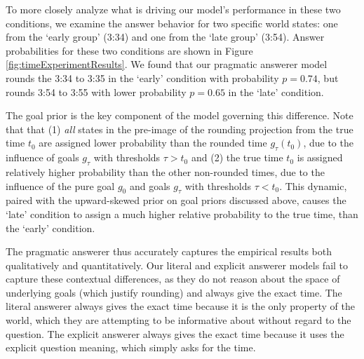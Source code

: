 \documentclass[12pt, floatsintext, jou]{apa6}
\begin{document}
To more closely analyze what is driving our model's performance in these two conditions, we examine the answer behavior for two specific world states: one from the `early group' (3:34) and one from the `late group' (3:54). Answer probabilities for these two conditions are shown in Figure \ref{fig:timeExperimentResults}. We found that our pragmatic answerer model rounds the 3:34 to 3:35 in the `early' condition with probability $p = 0.74$, but rounds 3:54 to 3:55 with lower probability $p = 0.65$ in the `late' condition. 

The goal prior is the key component of the model governing this difference. Note that that (1) \emph{all} states in the pre-image of the rounding projection from the true time $t_0$ are assigned lower probability than the rounded time $g_\tau(t_0)$, due to the influence of goals $g_\tau$ with thresholds $\tau > t_0$ and (2) the true time $t_0$ is assigned relatively higher probability than the other non-rounded times, due to the influence of the pure goal $g_0$ and goals $g_\tau$ with thresholds $\tau < t_0$. This dynamic, paired with the upward-skewed prior on goal priors discussed above, causes the `late' condition to assign a much higher relative probability to the true time, than the `early' condition.

The pragmatic answerer thus accurately captures the empirical results both qualitatively and quantitatively. Our literal and explicit answerer models fail to capture these contextual differences, as they do not reason about the space of underlying goals (which justify rounding) and always give the exact time. The literal answerer always gives the exact time because it is the only property of the world, which they are attempting to be informative about without regard to the question. The explicit answerer always gives the exact time because it uses the explicit question meaning, which simply asks for the time.

\end{document}
